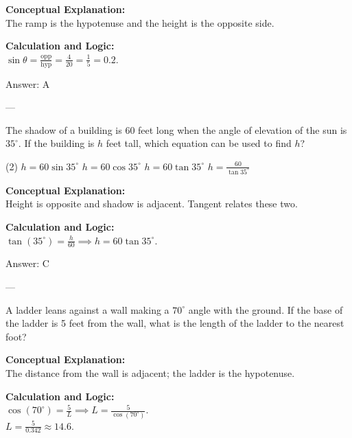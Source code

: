 \documentclass[11pt,paper=a4,answers]{exam}
\begin{document}
\begin{questions}
\begin{solution}
\textbf{Conceptual Explanation:} \\
The ramp is the hypotenuse and the height is the opposite side.

\vspace{10pt}
\textbf{Calculation and Logic:} \\
$\sin \theta = \frac{\text{opp}}{\text{hyp}} = \frac{4}{20} = \frac{1}{5} = 0.2$.

\vspace{15pt}
Answer: \colorbox{yellow!100}{A}
\end{solution}

---

\question
The shadow of a building is 60 feet long when the angle of elevation of the sun is $35^\circ$. If the building is $h$ feet tall, which equation can be used to find $h$?
\begin{tasks}(2)
    \task $h = 60 \sin 35^\circ$
    \task $h = 60 \cos 35^\circ$
    \task $h = 60 \tan 35^\circ$
    \task $h = \frac{60}{\tan 35^\circ}$
\end{tasks}

\begin{solution}
\textbf{Conceptual Explanation:} \\
Height is opposite and shadow is adjacent. Tangent relates these two.

\vspace{10pt}
\textbf{Calculation and Logic:} \\
$\tan(35^\circ) = \frac{h}{60} \implies h = 60 \tan 35^\circ$.

\vspace{15pt}
Answer: \colorbox{yellow!100}{C}
\end{solution}

---

\question
A ladder leans against a wall making a $70^\circ$ angle with the ground. If the base of the ladder is 5 feet from the wall, what is the length of the ladder to the nearest foot?

\begin{solution}
\textbf{Conceptual Explanation:} \\
The distance from the wall is adjacent; the ladder is the hypotenuse.

\vspace{10pt}
\textbf{Calculation and Logic:} \\
$\cos(70^\circ) = \frac{5}{L} \implies L = \frac{5}{\cos(70^\circ)}$. \\
$L = \frac{5}{0.342} \approx 14.6$.


\end{solution}
\end{questions}
\end{document}
